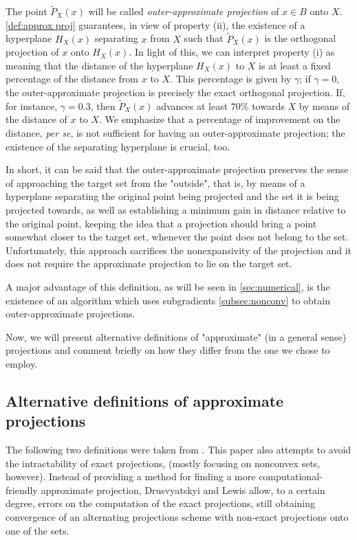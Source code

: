 \documentclass[smallextended,numbook,nospthms]{svjour3}
\theoremstyle{plain}
\theoremstyle{definition}
\begin{document}
The point $\tilde{P}_{X}(x)$ will be called \emph{outer-approximate projection} of $x \in B$ onto $X$. \cref{def:approx proj} guarantees, in view of property (ii), the existence of a hyperplane $H_{X}(x)$ separating $x$ from $X$ such that $\tilde{P}_{X}(x)$ is the orthogonal projection of $x$ onto $H_{X}(x)$. In light of this, we can interpret property (i) as meaning that the distance of the hyperplane $H_{X}(x)$ to $X$ is at least a fixed percentage of the distance from $x$ to $X$. This percentage is given by $\gamma$; if $\gamma=0$, the outer-approximate projection is precisely the exact orthogonal projection. If, for instance, $\gamma = 0.3$, then $\tilde{P}_{X}(x)$ advances at least $70 \%$ towards $X$ by means of the distance of $x$ to $X$. We emphasize that a percentage of improvement on the distance, \emph{per se}, is not sufficient for having an outer-approximate projection; the existence of the separating hyperplane is crucial, too.

In short, it can be said that the outer-approximate projection preserves the sense of approaching the target set from the "outside", that is, by means of a hyperplane separating the original point being projected and the set it is being projected towards, as well as establishing a minimum gain in distance relative to the original point, keeping the idea that a projection should bring a point somewhat closer to the target set, whenever the point does not belong to the set. Unfortunately, this approach sacrifices the nonexpansivity of the projection and it does not require the approximate projection to lie on the target set.

A major advantage of this definition, as will be seen in \cref{sec:numerical}, is the existence of an algorithm which uses subgradients \cref{subsec:nonconv} to obtain outer-approximate projections.

Now, we will present alternative definitions of "approximate" (in a general sense) projections and comment briefly on how they differ from the one we chose to employ.

\subsection{Alternative definitions of approximate projections}

The following two definitions were taken from \cite{Drusvyatskiy:2018}. This paper also attempts to avoid the intractability of exact projections, (mostly focusing on nonconvex sets, however). Instead of providing a method for finding a more computational-friendly approximate projection, Drusvyatskyi and Lewis allow, to a certain degree, errors on the computation of the exact projections, still obtaining convergence of an alternating projections scheme with non-exact projections onto one of the sets.
\end{document}
